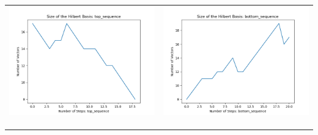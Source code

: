 \documentclass[10pt]{article}
\begin{document}
\begin{tabular}{c|c}
\begin{minipage}{.45\textwidth}
\includegraphics[width=\textwidth]{"DATA/4d/5 generators 2 bound A/top_sequence SIZE"}
\end{minipage} &
\begin{minipage}{.45\textwidth}
\includegraphics[width=\textwidth]{"DATA/4d/5 generators 2 bound A bottomup/bottom_sequence SIZE"}
\end{minipage} \\ \\
\hline \\\begin{minipage}{.45\textwidth}

\end{minipage}
\end{tabular}
\end{document}

